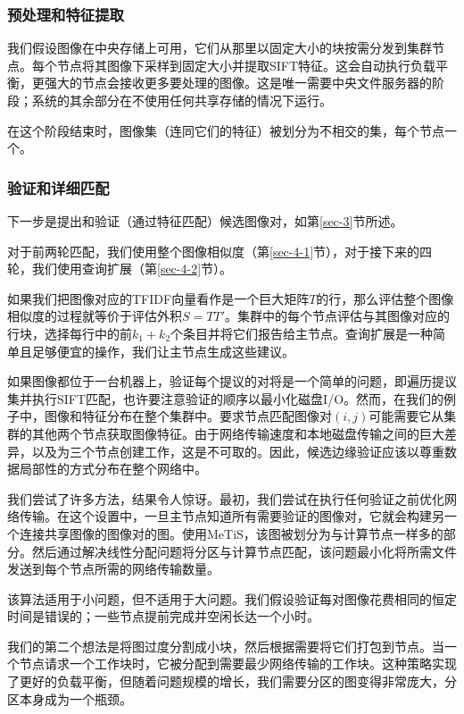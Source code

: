 \begin{translation}
\subsubsection{预处理和特征提取}
\label{sec-4-3-1}
我们假设图像在中央存储上可用，它们从那里以固定大小的块按需分发到集群节点。每个节点将其图像下采样到固定大小并提取SIFT特征。这会自动执行负载平衡，更强大的节点会接收更多要处理的图像。这是唯一需要中央文件服务器的阶段；系统的其余部分在不使用任何共享存储的情况下运行。

在这个阶段结束时，图像集（连同它们的特征）被划分为不相交的集，每个节点一个。

\subsubsection{验证和详细匹配}
\label{sec-4-3-2}
下一步是提出和验证（通过特征匹配）候选图像对，如第\ref{sec-3}节所述。

对于前两轮匹配，我们使用整个图像相似度（第\ref{sec-4-1}节），对于接下来的四轮，我们使用查询扩展（第\ref{sec-4-2}节）。

如果我们把图像对应的TFIDF向量看作是一个巨大矩阵$T$的行，那么评估整个图像相似度的过程就等价于评估外积$S=TT'$。集群中的每个节点评估与其图像对应的行块，选择每行中的前$k_1+k_2$个条目并将它们报告给主节点。查询扩展是一种简单且足够便宜的操作，我们让主节点生成这些建议。

如果图像都位于一台机器上，验证每个提议的对将是一个简单的问题，即遍历提议集并执行SIFT匹配，也许要注意验证的顺序以最小化磁盘I/O。然而，在我们的例子中，图像和特征分布在整个集群中。要求节点匹配图像对$(i,j)$可能需要它从集群的其他两个节点获取图像特征。由于网络传输速度和本地磁盘传输之间的巨大差异，以及为三个节点创建工作，这是不可取的。因此，候选边缘验证应该以尊重数据局部性的方式分布在整个网络中。

我们尝试了许多方法，结果令人惊讶。最初，我们尝试在执行任何验证之前优化网络传输。在这个设置中，一旦主节点知道所有需要验证的图像对，它就会构建另一个连接共享图像的图像对的图。使用MeTiS\cite{karypis1998fast}，该图被划分为与计算节点一样多的部分。然后通过解决线性分配问题将分区与计算节点匹配，该问题最小化将所需文件发送到每个节点所需的网络传输数量。

该算法适用于小问题，但不适用于大问题。我们假设验证每对图像花费相同的恒定时间是错误的；一些节点提前完成并空闲长达一个小时。

我们的第二个想法是将图过度分割成小块，然后根据需要将它们打包到节点。当一个节点请求一个工作块时，它被分配到需要最少网络传输的工作块。这种策略实现了更好的负载平衡，但随着问题规模的增长，我们需要分区的图变得非常庞大，分区本身成为一个瓶颈。


\end{translation}
